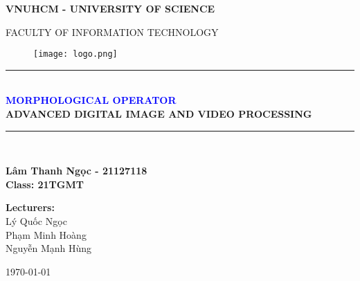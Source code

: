 \documentclass{report}
\newcommand\HRule{\rule{\textwidth}{1pt}}
\begin{document}
\begin{titlepage}


\begin{center}
\textsc{\Large \textbf{VNUHCM - UNIVERSITY OF SCIENCE}}\\

\bigskip

\textsc{\Large FACULTY OF INFORMATION TECHNOLOGY}\\

\bigskip

\begin{figure}[!h]
    \centering
    \texttt{[image: logo.png]}
\end{figure}

\HRule \\[0.4cm]
{\huge\bfseries \textcolor{blue}{MORPHOLOGICAL OPERATOR}}\\[0.4cm]
{\Large\bfseries ADVANCED DIGITAL IMAGE AND VIDEO PROCESSING}
\HRule \\[1cm]

\begin{center}
    \textbf{\Large Lâm Thanh Ngọc - 21127118} \\
    \medskip
    \Large{\textbf{Class: 21TGMT}}\\[4cm]
\end{center}

\begin{center}
    \textbf{\Large Lecturers: \\[0.2cm]}
    \Large{Lý Quốc Ngọc \\[0.2cm] Phạm Minh Hoàng \\ [0.2cm] Nguyễn Mạnh Hùng}
\end{center}
\vfill


{\today}
\end{center}
\end{titlepage}
\end{document}
